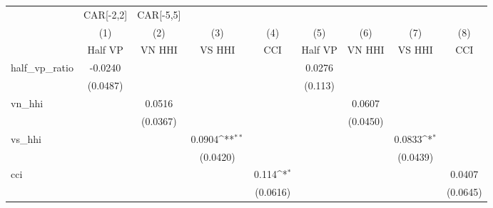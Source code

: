 {
\def\sym#1{\ifmmode^{#1}\else\(^{#1}\)\fi}
\begin{tabular}{l*{8}{c}}
\hline\hline
                    &\multicolumn{1}{c}{CAR[-2,2]}&\multicolumn{1}{c}{CAR[-5,5]}&\multicolumn{1}{c}{} &\multicolumn{5}{c}{}                                                                                         \\
                    &\multicolumn{1}{c}{(1)}&\multicolumn{1}{c}{(2)}&\multicolumn{1}{c}{(3)}&\multicolumn{1}{c}{(4)}&\multicolumn{1}{c}{(5)}&\multicolumn{1}{c}{(6)}&\multicolumn{1}{c}{(7)}&\multicolumn{1}{c}{(8)}\\
                    &\multicolumn{1}{c}{Half VP}&\multicolumn{1}{c}{VN HHI}&\multicolumn{1}{c}{VS HHI}&\multicolumn{1}{c}{CCI}&\multicolumn{1}{c}{Half VP}&\multicolumn{1}{c}{VN HHI}&\multicolumn{1}{c}{VS HHI}&\multicolumn{1}{c}{CCI}\\
\hline
half\_vp\_ratio       &     -0.0240         &                     &                     &                     &      0.0276         &                     &                     &                     \\
                    &    (0.0487)         &                     &                     &                     &     (0.113)         &                     &                     &                     \\
vn\_hhi              &                     &      0.0516         &                     &                     &                     &      0.0607         &                     &                     \\
                    &                     &    (0.0367)         &                     &                     &                     &    (0.0450)         &                     &                     \\
vs\_hhi              &                     &                     &      0.0904\sym{**} &                     &                     &                     &      0.0833\sym{*}  &                     \\
                    &                     &                     &    (0.0420)         &                     &                     &                     &    (0.0439)         &                     \\
cci                 &                     &                     &                     &       0.114\sym{*}  &                     &                     &                     &      0.0407         \\
                    &                     &                     &                     &    (0.0616)         &                     &                     &                     &    (0.0645)         \\

\end{tabular}}
